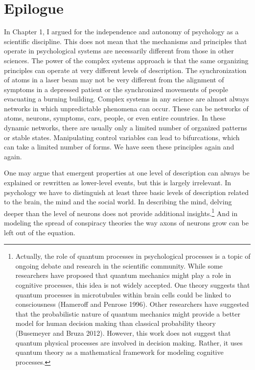 \documentclass[
  letterpaper,
]{scrbook}
\begin{document}

\hypertarget{epilogue}{%
\chapter{Epilogue}\label{epilogue}}

In Chapter 1, I argued for the independence and autonomy of psychology
as a scientific discipline. This does not mean that the mechanisms and
principles that operate in psychological systems are necessarily
different from those in other sciences. The power of the complex systems
approach is that the same organizing principles can operate at very
different levels of description. The synchronization of atoms in a laser
beam may not be very different from the alignment of symptoms in a
depressed patient or the synchronized movements of people evacuating a
burning building. Complex systems in any science are almost always
networks in which unpredictable phenomena can occur. These can be
networks of atoms, neurons, symptoms, cars, people, or even entire
countries. In these dynamic networks, there are usually only a limited
number of organized patterns or stable states. Manipulating control
variables can lead to bifurcations, which can take a limited number of
forms. We have seen these principles again and again.

One may argue that emergent properties at one level of description can
always be explained or rewritten as lower-level events, but this is
largely irrelevant. In psychology we have to distinguish at least three
basic levels of description related to the brain, the mind and the
social world. In describing the mind, delving deeper than the level of
neurons does not provide additional insights.\footnote{Actually, the
  role of quantum processes in psychological processes is a topic of
  ongoing debate and research in the scientific community. While some
  researchers have proposed that quantum mechanics might play a role in
  cognitive processes, this idea is not widely accepted. One theory
  suggests that quantum processes in microtubules within brain cells
  could be linked to consciousness (Hameroff and Penrose 1996). Other
  researchers have suggested that the probabilistic nature of quantum
  mechanics might provide a better model for human decision making than
  classical probability theory (Busemeyer and Bruza 2012). However, this
  work does not suggest that quantum physical processes are involved in
  decision making. Rather, it uses quantum theory as a mathematical
  framework for modeling cognitive processes.} And in modeling the
spread of conspiracy theories the way axons of neurons grow can be left
out of the equation.
\end{document}
